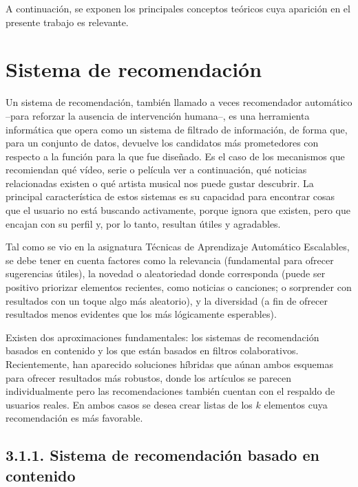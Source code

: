 \label{Conceptos teóricos}

A continuación, se exponen los principales conceptos teóricos cuya aparición en el presente trabajo es relevante.

\section{Sistema de recomendación}

Un sistema de recomendación, también llamado a veces recomendador automático –para reforzar la ausencia de intervención humana–, es una herramienta informática que opera como un sistema de filtrado de información, de forma que, para un conjunto de datos, devuelve los candidatos más prometedores con respecto a la función para la que fue diseñado. Es el caso de los mecanismos que recomiendan qué vídeo, serie o película ver a continuación, qué noticias relacionadas existen o qué artista musical nos puede gustar descubrir. La principal característica de estos sistemas es su capacidad para encontrar cosas que el usuario no está buscando activamente, porque ignora que existen, pero que encajan con su perfil y, por lo tanto, resultan útiles y agradables.

Tal como se vio en la asignatura \guillemotleft Técnicas de Aprendizaje Automático Escalables\guillemotright, se debe tener en cuenta factores como la relevancia (fundamental para ofrecer sugerencias útiles), la novedad o aleatoriedad donde corresponda (puede ser positivo priorizar elementos recientes, como noticias o canciones; o sorprender con resultados con un toque algo más aleatorio), y la diversidad (a fin de ofrecer resultados menos evidentes que los más lógicamente esperables).

Existen dos aproximaciones fundamentales: los sistemas de recomendación basados en contenido y los que están basados en filtros colaborativos. Recientemente, han aparecido soluciones híbridas que aúnan ambos esquemas para ofrecer resultados más robustos, donde los artículos se parecen individualmente pero las recomendaciones también cuentan con el respaldo de usuarios reales. En ambos casos se desea crear listas de los $k$ elementos cuya recomendación es más favorable.

\subsection{3.1.1. Sistema de recomendación basado en contenido}

